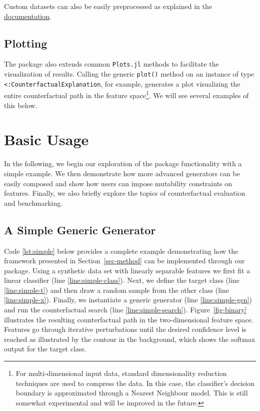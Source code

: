 \documentclass[
  letterpaper,
  DIV=11,
  numbers=noendperiod]{scrartcl}
\begin{document}
Custom datasets can also be easily preprocessed as explained in the
\href{https://juliatrustworthyai.github.io/CounterfactualExplanations.jl/v0.1/tutorials/data_preprocessing/}{documentation}.

\hypertarget{plotting}{%
\subsection{Plotting}\label{plotting}}

The package also extends common \texttt{Plots.jl} methods to facilitate
the visualization of results. Calling the generic \texttt{plot()} method
on an instance of type \texttt{\textless{}:CounterfactualExplanation},
for example, generates a plot visualizing the entire counterfactual path
in the feature space\footnote{For multi-dimensional input data, standard
  dimensionality reduction techniques are used to compress the data. In
  this case, the classifier's decision boundary is approximated through
  a Nearest Neighbour model. This is still somewhat experimental and
  will be improved in the future.}. We will see several examples of this
below.

\hypertarget{sec-use}{%
\section{Basic Usage}\label{sec-use}}

In the following, we begin our exploration of the package functionality
with a simple example. We then demonstrate how more advanced generators
can be easily composed and show how users can impose mutability
constraints on features. Finally, we also briefly explore the topics of
counterfactual evaluation and benchmarking.

\hypertarget{sec-simple}{%
\subsection{A Simple Generic Generator}\label{sec-simple}}

Code \ref{lst:simple} below provides a complete example demonstrating
how the framework presented in Section~\ref{sec-method} can be
implemented through our package. Using a synthetic data set with
linearly separable features we first fit a linear classifier (line
\ref{line:simple-class}). Next, we define the target class (line
\ref{line:simple-t}) and then draw a random sample from the other class
(line \ref{line:simple-x}). Finally, we instantiate a generic generator
(line \ref{line:simple-gen}) and run the counterfactual search (line
\ref{line:simple-search}). Figure~\ref{fig-binary} illustrates the
resulting counterfactual path in the two-dimensional feature space.
Features go through iterative perturbations until the desired confidence
level is reached as illustrated by the contour in the background, which
shows the softmax output for the target class.
\end{document}
